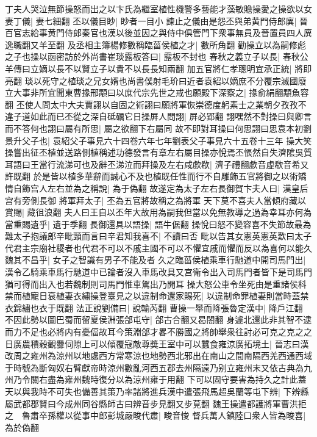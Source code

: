 丁夫人哭泣無節操怒而出之以卞氏為繼室植性機警多藝能才藻敏贍操愛之操欲以女妻丁儀|{
	妻七細翻}
丕以儀目眇|{
	眇者一目小}
諫止之儀由是怨丕與弟黄門侍郎廙|{
	晉百官志給事黄門侍郎秦官也漢以後並因之與侍中俱管門下衆事無員及晉置員四人廙逸職翻又羊至翻}
及丞相主簿楊修數稱臨菑侯植之才|{
	數所角翻}
勸操立以為嗣修彪之子也操以函密訪於外尚書崔琰露板答曰|{
	露板不封也}
春秋之義立子以長|{
	春秋公羊傳曰立嫡以長不以賢立子以貴不以長長知兩翻}
加五官將仁孝聰明宜承正統|{
	將即亮翻}
琰以死守之植琰之兄女婿也尚書僕射毛玠曰近者袁紹以嫡庶不分覆宗滅國廢立大事非所宜聞東曹掾邢顒曰以庶代宗先世之戒也願殿下深察之|{
	掾俞絹翻顒魚容翻}
丕使人問太中大夫賈詡以自固之術詡曰願將軍恢崇德度躬素士之業朝夕孜孜不違子道如此而已丕從之深自砥礪它日操屛人問詡|{
	屏必郢翻}
詡嘿然不對操曰與卿言而不答何也詡曰屬有所思|{
	屬之欲翻下右屬同}
故不即對耳操曰何思詡曰思袁本初劉景升父子也|{
	袁紹父子事見六十四卷六年七年劉表父子事見六十五卷十三年}
操大笑操嘗出征丕植並送路側植稱述功德發言有章左右屬目操亦悅焉丕悵然自失濟隂吳質耳語曰王當行流涕可也及辭丕涕泣而拜操及左右咸歔欷|{
	濟子禮翻歔音虛欷音希又許既翻}
於是皆以植多華辭而誠心不及也植既任性而行不自雕飾五官將御之以術矯情自飾宫人左右並為之稱說|{
	為于偽翻}
故遂定為太子左右長御賀卞夫人曰|{
	漢皇后宫有旁側長御}
將軍拜太子|{
	丕為五官將故稱之為將軍}
天下莫不喜夫人當傾府藏以賞賜|{
	藏徂浪翻}
夫人曰王自以丕年大故用為嗣我但當以免無教導之過為幸耳亦何為當重賜遺乎|{
	遺于季翻}
長御還具以語操|{
	語牛倨翻}
操悅曰怒不變容喜不失節故最為難太子抱議郎辛毗頸而言曰辛君知我喜不|{
	不讀曰否}
毗以告其女憲英憲英歎曰太子代君主宗廟社稷者也代君不可以不戚主國不可以不懼宜戚而懼而反以為喜何以能久魏其不昌乎|{
	女子之智識有男子不能及者}
久之臨菑侯植乘車行馳道中開司馬門出|{
	漢令乙騎乘車馬行馳道中已論者沒入車馬改具又宫衛令出入司馬門者皆下是司馬門猶可得而出入也若魏制則司馬門惟車駕出乃開耳}
操大怒公車令坐死由是重諸侯科禁而植寵日衰植妻衣繡操登臺見之以違制命還家賜死|{
	以違制命罪植妻則當時蓋禁衣錦繡也衣于既翻}
法正說劉備曰|{
	說輸芮翻}
曹操一舉而降張魯定漢中|{
	降戶江翻}
不因此勢以圖巴蜀而留夏侯淵張郃屯守|{
	郃古合翻又曷閤翻}
身遽北還此非其智不逮而力不足也必將内有憂偪故耳今策淵郃才畧不勝國之將帥舉衆往討必可克之克之之日廣農積穀觀釁伺隙上可以傾覆寇敵尊奬王室中可以蠶食雍涼廣拓境土|{
	晉志曰漢改周之雍州為涼州以地處西方常寒涼也地勢西北邪出在南山之間南隔西羌西通西域于時號為斷匈奴右臂獻帝時涼州數亂河西五郡去州隔遠乃别立雍州末又依古典為九州乃令關右盡為雍州魏時復分以為涼州雍于用翻}
下可以固守要害為持久之計此蓋天以與我時不可失也備善其策乃率諸將進兵漢中遣張飛馬超吳蘭等屯下辨|{
	下辨縣屬武都郡賢曰今成州同谷縣師古曰辨音步見翻又步莧翻}
魏王操遣都護將軍曹洪拒之　魯肅卒孫權以從事中郎彭城嚴畯代肅|{
	畯音悛}
督兵萬人鎮陸口衆人皆為畯喜|{
	為於偽翻}

